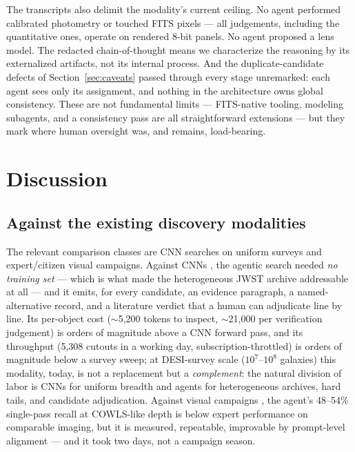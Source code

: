\documentclass[11pt,letterpaper]{article}
\begin{document}
The transcripts also delimit the modality's current ceiling. No agent
performed calibrated photometry or touched FITS pixels --- all judgements,
including the quantitative ones, operate on rendered 8-bit panels. No agent
proposed a lens model. The redacted chain-of-thought means we characterize
the reasoning by its externalized artifacts, not its internal process. And
the duplicate-candidate defects of Section~\ref{sec:caveats} passed through
every stage unremarked: each agent sees only its assignment, and nothing in
the architecture owns global consistency. These are not fundamental limits
--- FITS-native tooling, modeling subagents, and a consistency pass are all
straightforward extensions --- but they mark where human oversight was, and
remains, load-bearing.

\section{Discussion}\label{sec:discussion}

\subsection{Against the existing discovery modalities}\label{sec:compare}

The relevant comparison classes are CNN searches on uniform surveys and
expert/citizen visual campaigns. Against CNNs
\citep{huang2020finding,huang2021discovering,storfer2024new,inchausti2025strong,
petrillo2017finding,jacobs2019extended}, the agentic search needed \emph{no
training set} --- which is what made the heterogeneous JWST archive
addressable at all --- and it emits, for every candidate, an evidence
paragraph, a named-alternative record, and a literature verdict that a human
can adjudicate line by line. Its per-object cost ($\sim$5{,}200 tokens to
inspect, $\sim$21{,}000 per verification judgement) is orders of magnitude
above a CNN forward pass, and its throughput (5{,}308 cutouts in a working
day, subscription-throttled) is orders of magnitude below a survey sweep; at
DESI-survey scale ($10^7$--$10^8$ galaxies) this modality, today, is not a
replacement but a \emph{complement}: the natural division of labor is CNNs
for uniform breadth and agents for heterogeneous archives, hard tails, and
candidate adjudication. Against visual campaigns
\citep{marshall2016spacewarps,garvin2022hubble,mahler2025cowls2}, the agent's
48--54\% single-pass recall at COWLS-like depth is below expert performance
on comparable imaging, but it is measured, repeatable, improvable by
prompt-level alignment --- and it took two days, not a campaign season.
\end{document}
